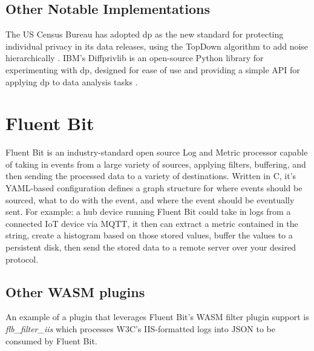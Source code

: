 \subsection{Other Notable Implementations}
The US Census Bureau has adopted \acrshort{dp} as the new standard for protecting individual privacy in its data releases, using the TopDown algorithm to add noise hierarchically \cite{Gong2022Harnessing}. IBM's Diffprivlib is an open-source Python library for experimenting with \acrshort{dp}, designed for ease of use and providing a simple API for applying \acrshort{dp} to data analysis tasks \cite{holohan2019diffprivlib}.


\section{Fluent Bit}
Fluent Bit is an industry-standard open source Log and Metric processor capable of taking in events from a large variety of sources, applying filters, buffering, and then sending the processed data to a variety of destinations.\cite{What-is-Fluent-Bit} Written in C, it's YAML-based configuration defines a graph structure for where events should be sourced, what to do with the event, and where the event should be eventually sent. For example: a hub device running Fluent Bit could take in logs from a connected IoT device via MQTT, it then can extract a metric contained in the string, create a histogram based on those stored values, buffer the values to a persistent disk, then send the stored data to a remote server over your desired protocol.
\subsection{Other WASM plugins}
An example of a plugin that leverages Fluent Bit's WASM filter plugin support is \textit{flb\_filter\_iis}\cite{Ortega} which processes W3C's IIS-formatted logs into JSON to be consumed by Fluent Bit.